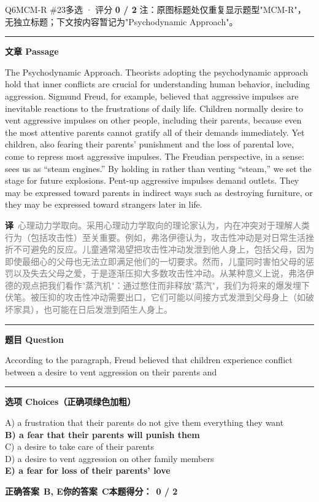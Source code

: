 \documentclass[11pt]{article}
\newcommand{\ptesub}[1]{%
  \par\needspace{2\baselineskip}\smallskip
  {\color{cAccent}\rule[-0.2ex]{3pt}{1.05em}}\hspace{6pt}%
  {\bfseries\color{cHead}#1}\par\nopagebreak\smallskip}
\newcommand{\zh}[1]{{\footnotesize\textcolor{cNote}{\textbf{译}}\ \textcolor{gray}{#1}}}
\begin{document}
\begin{qblock}{Q6\quad MCM-R \#23}{多选 · 评分 \textcolor{cAccent}{\bfseries 0 / 2}}
{\footnotesize\color{gray} 注：原图标题处仅重复显示题型"MCM-R"，无独立标题；下文按内容暂记为"Psychodynamic Approach"。}
\ptesub{文章 Passage}
\begin{promptbox}
The Psychodynamic Approach. Theorists adopting the psychodynamic approach hold that inner conflicts are crucial for understanding human behavior, including aggression. Sigmund Freud, for example, believed that aggressive impulses are inevitable reactions to the frustrations of daily life. Children normally desire to vent aggressive impulses on other people, including their parents, because even the most attentive parents cannot gratify all of their demands immediately. Yet children, also fearing their parents' punishment and the loss of parental love, come to repress most aggressive impulses. The Freudian perspective, in a sense: sees us as ``steam engines.'' By holding in rather than venting ``steam,'' we set the stage for future explosions. Pent-up aggressive impulses demand outlets. They may be expressed toward parents in indirect ways such as destroying furniture, or they may be expressed toward strangers later in life.
\end{promptbox}
\zh{心理动力学取向。采用心理动力学取向的理论家认为，内在冲突对于理解人类行为（包括攻击性）至关重要。例如，弗洛伊德认为，攻击性冲动是对日常生活挫折不可避免的反应。儿童通常渴望把攻击性冲动发泄到他人身上，包括父母，因为即使最细心的父母也无法立即满足他们的一切要求。然而，儿童同时害怕父母的惩罚以及失去父母之爱，于是逐渐压抑大多数攻击性冲动。从某种意义上说，弗洛伊德的观点把我们看作"蒸汽机"：通过憋住而非释放"蒸汽"，我们为将来的爆发埋下伏笔。被压抑的攻击性冲动需要出口，它们可能以间接方式发泄到父母身上（如破坏家具），也可能在日后发泄到陌生人身上。}
\ptesub{题目 Question}
\begin{notebox}According to the paragraph, Freud believed that children experience conflict between a desire to vent aggression on their parents and\end{notebox}
\ptesub{选项 Choices（正确项绿色加粗）}
{\small
A) a frustration that their parents do not give them everything they want\\
{\color{cFix}\textbf{B) a fear that their parents will punish them}}\\
C) a desire to take care of their parents\\
D) a desire to vent aggression on other family members\\
{\color{cFix}\textbf{E) a fear for loss of their parents' love}}}
\par\smallskip
\textbf{正确答案}\ \textcolor{cFix}{\bfseries B, E}\qquad\textbf{你的答案}\ {\color{cWrong}\bfseries C}\qquad\textbf{本题得分：}\ {\color{cAccent}\bfseries 0 / 2}
\end{qblock}
\end{document}
